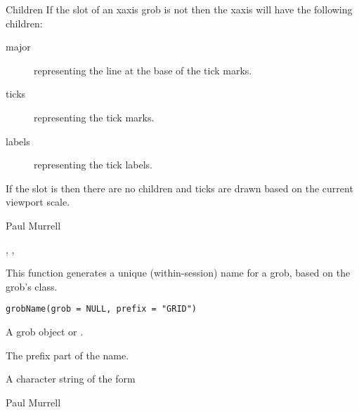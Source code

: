 %
\begin{Section}{Children}
If the  slot of an xaxis grob is not  then
the xaxis will have the following children:
\begin{description}

\item[major]  representing the line at the base of the
tick marks.
\item[ticks] representing the tick marks.
\item[labels] representing the tick labels.

\end{description}


If the  slot is  then there are no children
and ticks are drawn based on the current viewport scale.
\end{Section}
%
\begin{Author}\relax
Paul Murrell
\end{Author}
%
\begin{SeeAlso}\relax
{},
,
\end{SeeAlso}
%
\begin{Description}\relax
This function generates a unique (within-session) name for
a grob, based on the grob's class.
\end{Description}
%
\begin{Usage}
\begin{verbatim}
grobName(grob = NULL, prefix = "GRID")
\end{verbatim}
\end{Usage}
%
\begin{Arguments}
\begin{ldescription}
\item[\code{grob}] A grob object or .
\item[\code{prefix}] The prefix part of the name.
\end{ldescription}
\end{Arguments}
%
\begin{Value}
A character string of the form 
\end{Value}
%
\begin{Author}\relax
Paul Murrell
\end{Author}
